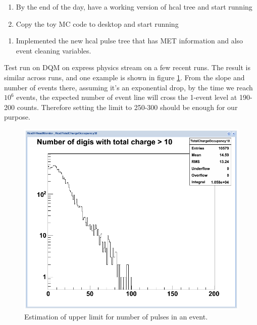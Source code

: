 

\begin{enumerate}
\item By the end of the day, have a working version of hcal tree and start running
\item Copy the toy MC code to desktop and start running
\end{enumerate}


\begin{enumerate}
\item Implemented the new hcal pulse tree that has MET information and also event cleaning variables.
\end{enumerate}


Test run on DQM on express physics stream on a few recent runs.
The result is similar across runs, and one example is shown in figure \ref{Figure_6333NumberOfPulseAbove10fC}.
From the slope and number of events there, assuming it's an exponential drop, by the time we reach $10^6$ events,
the expected number of event line will cross the 1-event level at 190-200 counts.
Therefore setting the limit to 250-300 should be enough for our purpose.

\begin{figure}
   \includegraphics[width=120mm]{DailyLog/6333/6333NumberOfPulseAbove10fC.png}
   \caption{Estimation of upper limit for number of pulses in an event.}
   \label{Figure_6333NumberOfPulseAbove10fC}
\end{figure}


